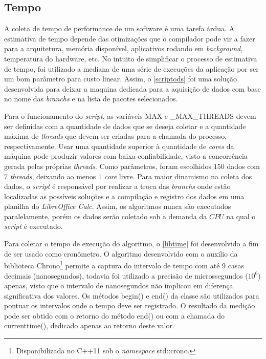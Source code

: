 \subsection*{Tempo} %
\label{sec:tempo}

A coleta de tempo de performance de um software é uma tarefa árdua. A estimativa de tempo depende das otimizações que o compilador pode vir a fazer para a arquitetura, memória disponível, aplicativos rodando em \textit{background}, temperatura do hardware, etc. No intuito de simplificar o processo de estimativa de tempo, foi utilizado a mediana de uma série de execuções da aplicação por ser um bom parâmetro para custo linear. Assim, o \autoref{scriptods} foi uma solução desenvolvida para deixar a maquina dedicada para a aquisição de dados com base no nome das \textit{branchs} e na lista de pacotes selecionados.

Para o funcionamento do \textit{script}, as variáveis {\code MAX} e {\code \_MAX\_THREADS} devem ser definidas com a quantidade de dados que se deseja coletar e a quantidade máxima de \textit{threads} que devem ser criadas para a chamada do processo, respectivamente. Usar uma quantidade superior à quantidade de \textit{cores}  da máquina pode produzir valores com baixa confiabilidade, visto a concorrência gerada pelas próprias \textit{threads}. Como parâmetros, foram escolhidos $150$ dados com $7$ \textit{threads}, deixando ao menos $1$ \textit{core} livre. Para maior dinamismo na coleta dos dados, o \textit{script} é responsável por realizar a troca das \textit{branchs} onde estão localizadas as possíveis soluções e a compilação e registro dos dados em uma planilha do \textit{LibreOffice Calc}. Assim, os algoritmos nunca são executados paralelamente, porém os dados serão coletado sob a demanda da $CPU$ na qual o \textit{script} é executado.

Para coletar o tempo de execução do algoritmo, o \autoref{libtime} foi desenvolvido a fim de ser usado como cronômetro. O algoritmo desenvolvido com o auxilio da biblioteca {\code Chrono}\footnote{Disponibilizada no {\code C++11} sob o \textit{namespace} {\code std::crono}.} permite a captura do intervalo de tempo com até $9$ casas decimais (nanosegundos), todavia foi utilizado a precisão de microssegundos ($10^ 6$) apenas, visto que o intervalo de nanosegundos não implicou em diferença significativa dos valores. Os métodos {\code begin()} e {\code end()} da classe são utilizados para pontuar os intervalos onde o tempo deve ser registrado. O resultado da medição pode ser obtido com o retorno do método {\code end()} ou com a chamada do {\code currenttime()}, dedicado apenas ao retorno deste valor.

